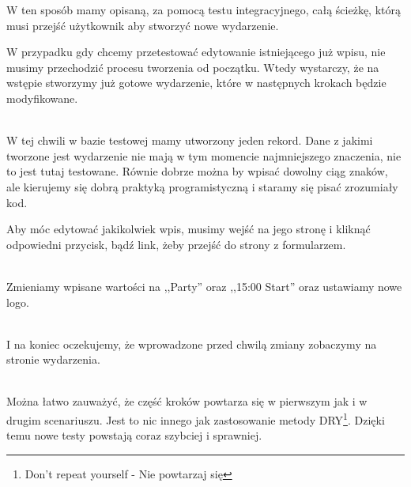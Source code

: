 W ten sposób mamy opisaną, za pomocą testu integracyjnego, całą ścieżkę, którą musi przejść użytkownik aby stworzyć nowe wydarzenie.

W przypadku gdy chcemy przetestować edytowanie istniejącego już wpisu, nie musimy przechodzić procesu tworzenia od początku. Wtedy wystarczy, że na wstępie stworzymy już gotowe wydarzenie, które w następnych krokach będzie modyfikowane.

\begin{code}
	
\end{code}\\

W tej chwili w bazie testowej mamy utworzony jeden rekord. Dane z jakimi tworzone jest wydarzenie nie mają w tym momencie najmniejszego znaczenia, nie to jest tutaj testowane. Równie dobrze można by wpisać dowolny ciąg znaków, ale kierujemy się dobrą praktyką programistyczną i staramy się pisać zrozumiały kod.

Aby móc edytować jakikolwiek wpis, musimy wejść na jego stronę i kliknąć odpowiedni przycisk, bądź link, żeby przejść do strony z formularzem.

\begin{code}
	
\end{code}\\

Zmieniamy wpisane wartości na ,,Party'' oraz ,,15:00 Start'' oraz ustawiamy nowe logo.

\begin{code}
	
\end{code}\\

I na koniec oczekujemy, że wprowadzone przed chwilą zmiany zobaczymy na stronie wydarzenia.

\begin{code}
	
\end{code}\\

Można łatwo zauważyć, że część kroków powtarza się w pierwszym jak i w drugim scenariuszu. Jest to nic innego jak zastosowanie metody DRY\footnote{Don't repeat yourself - Nie powtarzaj się}. Dzięki temu nowe testy powstają coraz szybciej i sprawniej.

